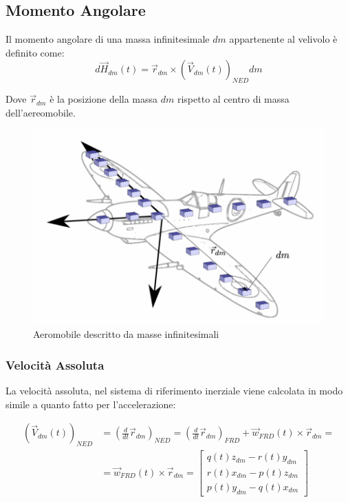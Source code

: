 \subsection{Momento Angolare}
Il momento angolare di una massa infinitesimale $dm$ appartenente al velivolo è definito come:
\begin{equation*}
    d\vec{H}_{dm}(t) = \vec{r}_{dm}\times \left(\vec{V}_{dm}(t)\right)_{NED} dm
\end{equation*}

Dove $\vec{r}_{dm}$ è la posizione della massa $dm$ rispetto al centro di massa dell'aereomobile.

\begin{figure}[H]
    \centering
    \includegraphics[width=0.5\linewidth]{Immagini/momento_angolare.jpg}
    \caption{Aeromobile descritto da masse infinitesimali \cite{smith_aircraft_flight_mechanics}}
\end{figure}

\subsubsection{Velocità Assoluta}
La velocità assoluta, nel sistema di riferimento inerziale viene calcolata in modo simile a quanto fatto per l'accelerazione:

\begin{equation*}
    \begin{split}
        \left(\vec{V}_{dm}(t)\right)_{NED} & = \left(\frac{d}{d t}\vec{r}_{dm}\right)_{NED} = \left(\frac{d}{d t}\vec{r}_{dm}\right)_{FRD} + \vec{w}_{FRD}(t) \times \vec{r}_{dm} = \\ &= \vec{w}_{FRD}(t) \times \vec{r}_{dm} = \begin{bmatrix}
            q(t)z_{dm} - r(t)y_{dm} \\
            r(t)x_{dm} - p(t)z_{dm} \\
            p(t)y_{dm} - q(t)x_{dm}
        \end{bmatrix}
    \end{split}
\end{equation*}

